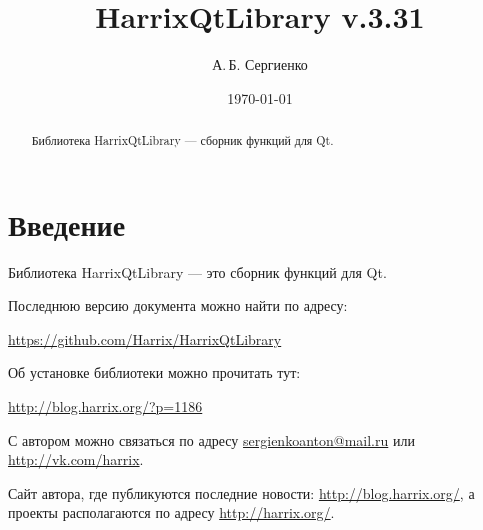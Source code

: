 \documentclass[a4paper,12pt]{article}
\title{HarrixQtLibrary v.3.31}
\author{А.\,Б. Сергиенко}
\date{\today}
\begin{document}


\maketitle

\begin{abstract}
Библиотека HarrixQtLibrary --- сборник функций для Qt.
\end{abstract}

\tableofcontents

\newpage

\section{Введение}

Библиотека HarrixQtLibrary --- это сборник функций для Qt.

Последнюю версию документа можно найти по адресу:

\href{https://github.com/Harrix/HarrixQtLibrary}{https://github.com/Harrix/HarrixQtLibrary}

Об установке библиотеки можно прочитать тут:

\href{http://blog.harrix.org/?p=1186}{http://blog.harrix.org/?p=1186}

С автором можно связаться по адресу \href{mailto:sergienkoanton@mail.ru}{sergienkoanton@mail.ru} или  \href{http://vk.com/harrix}{http://vk.com/harrix}.

Сайт автора, где публикуются последние новости: \href{http://blog.harrix.org/}{http://blog.harrix.org/}, а проекты располагаются по адресу \href{http://harrix.org/}{http://harrix.org/}.


\newpage
\end{document}
